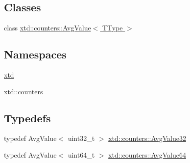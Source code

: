 \subsection*{Classes}
\begin{DoxyCompactItemize}
\item 
class \hyperlink{classxtd_1_1counters_1_1AvgValue}{xtd\+::counters\+::\+Avg\+Value$<$ T\+Type $>$}
\end{DoxyCompactItemize}
\subsection*{Namespaces}
\begin{DoxyCompactItemize}
\item 
 \hyperlink{namespacextd}{xtd}
\item 
 \hyperlink{namespacextd_1_1counters}{xtd\+::counters}
\end{DoxyCompactItemize}
\subsection*{Typedefs}
\begin{DoxyCompactItemize}
\item 
typedef Avg\+Value$<$ uint32\+\_\+t $>$ \hyperlink{namespacextd_1_1counters_a162dd5cde0e6fcc970c543f7420b4c14}{xtd\+::counters\+::\+Avg\+Value32}
\item 
typedef Avg\+Value$<$ uint64\+\_\+t $>$ \hyperlink{namespacextd_1_1counters_aa43118623f65cdf1ba43bffd8f17ea0e}{xtd\+::counters\+::\+Avg\+Value64}
\end{DoxyCompactItemize}
